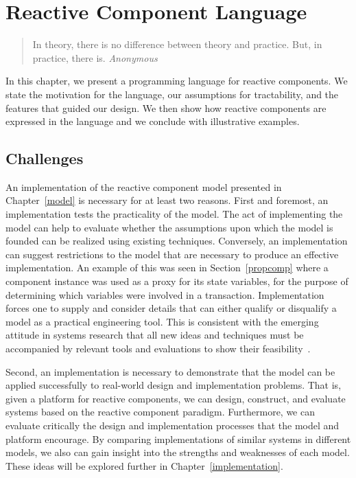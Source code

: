 \chapter{Reactive Component Language\label{language}}

\begin{quote}
In theory, there is no difference between theory and practice. \linebreak
But, in practice, there is.  \emph{Anonymous}
\end{quote}

In this chapter, we present a programming language for reactive components.
We state the motivation for the language, our assumptions for tractability, and the features that guided our design.
We then show how reactive components are expressed in the language and we conclude with illustrative examples.

\section{Challenges}
An implementation of the reactive component model presented in Chapter~\ref{model} is necessary for at least two reasons.
First and foremost, an implementation tests the practicality of the model.
The act of implementing the model can help to evaluate whether the assumptions upon which the model is founded can be realized using existing techniques.
Conversely, an implementation can suggest restrictions to the model that are necessary to produce an effective implementation.
An example of this was seen in Section~\ref{propcomp} where a component instance was used as a proxy for its state variables, for the purpose of determining which variables were involved in a transaction.
Implementation forces one to supply and consider details that can either qualify or disqualify a model as a practical engineering tool.
This is consistent with the emerging attitude in systems research that all new ideas and techniques must be accompanied by relevant tools and evaluations to show their feasibility~\cite{Krishnamurthi:2015:RSC:2739250.2658987}.

Second, an implementation is necessary to demonstrate that the model can be applied successfully to real-world design and implementation problems.
That is, given a platform for reactive components, we can design, construct, and evaluate systems based on the reactive component paradigm.
Furthermore, we can evaluate critically the design and implementation processes that the model and platform encourage.
By comparing implementations of similar systems in different models, we also can gain insight into the strengths and weaknesses of each model.
These ideas will be explored further in Chapter~\ref{implementation}.

